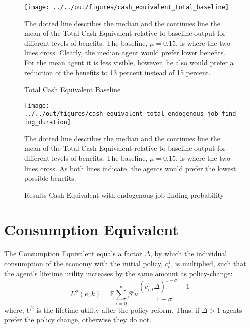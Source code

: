 \documentclass[a4paper,11pt]{article}
\begin{document}
\begin{figure}[!htbp]
\caption{Total Cash Equivalent Baseline} 
\label{total_cash_equivalent_baseline}	%
\centering
\texttt{[image: ../../out/figures/cash\_equivalent\_total\_baseline]}  %

\begin{minipage}{0.8\linewidth}
\footnotesize{The dotted line describes the median and the continues line the mean of the Total Cash Equivalent relative to baseline output for different levels of benefits. The baseline, $\mu = 0.15$, is where the two lines cross. Clearly, the median agent would prefer lower benefits. For the mean agent it is less visible, however, he also would prefer a reduction of the benefits to 13 percent instead of 15 percent.}
\end{minipage}

\end{figure}

\begin{figure}[!htbp]
\caption{Results Cash Equivalent with endogenous job-finding probability} 
\label{total_cash_equivalent_endogenous}	%
\centering
\texttt{[image: ../../out/figures/cash\_equivalent\_total\_endogenous\_job\_finding\_duration]} %

\begin{minipage}{0.8\linewidth}
\footnotesize{The dotted line describes the median and the continues line the mean of the Total Cash Equivalent relative to baseline output for different levels of benefits. The baseline, $\mu = 0.15$, is where the two lines cross. As both lines indicate, the agents would prefer the lowest possible benefits.}
\end{minipage}

\end{figure}


\section{Consumption Equivalent}

The Consumption Equivalent equals a factor $\Delta$, by which the individual consumption of the economy with the initial policy, $c^{1}_{t}$, is multiplied, such that the agent's lifetime utility increases by the same amount as policy-change:
\[
U^{2}(e,k) = \mathbb{E}\sum_{i=0}^{\infty} \beta^{t} u\frac{(c^{1}_{i,t}\Delta)^{1-\sigma}-1}{1-\sigma}
\]
where, $U^{2}$ is the lifetime utility after the policy reform. Thus, if $\Delta > 1$ agents prefer the policy change, otherwise they do not. 
 
\end{document}

